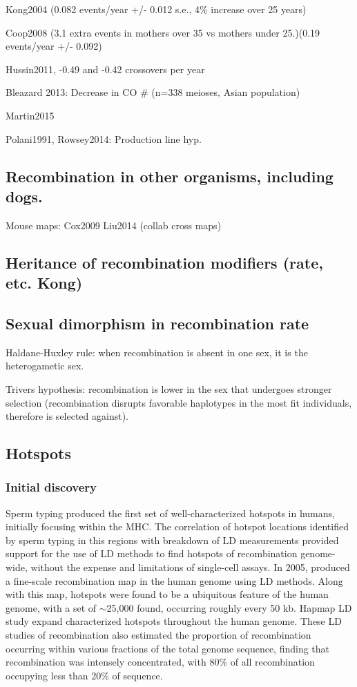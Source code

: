 Kong2004 (0.082 events/year +/- 0.012 s.e., 4\% increase over 25 years)

Coop2008 (3.1 extra events in mothers over 35 vs mothers under 25.)(0.19 events/year +/- 0.092)

Hussin2011, -0.49 and -0.42 crossovers per year

Bleazard 2013: Decrease in CO \# (n=338 meioses, Asian population)

Martin2015

Polani1991, Rowsey2014: Production line hyp.

\subsection{Recombination in other organisms, including dogs.}

Mouse maps:
Cox2009
Liu2014 (collab cross maps)

\subsection{Heritance of recombination modifiers (rate, etc. Kong)}
\subsection{Sexual dimorphism in recombination rate}

Haldane-Huxley rule: when recombination is absent in one sex, it is the heterogametic sex.

Trivers hypothesis: recombination is lower in the sex that undergoes stronger selection (recombination disrupts favorable haplotypes in the most fit individuals, therefore is selected against).

\subsection{Hotspots}

\subsubsection{Initial discovery}

Sperm typing produced the first set of well-characterized hotspots in humans, initially focusing within the MHC\cite{Jeffreys2000,Jeffreys2001}.
The correlation of hotspot locations identified by sperm typing in this regions with breakdown of LD measurements provided support for the use of LD methods to find hotspots of recombination genome-wide, without the expense and limitations of single-cell assays\cite{Jeffreys2001}.
In 2005, \citet{Myers2005} produced a fine-scale recombination map in the human genome using LD methods.
Along with this map, hotspots were found to be a ubiquitous feature of the human genome, with a set of $\sim$25,000 found, occurring roughly every 50 kb.
Hapmap LD study expand characterized hotspots throughout the human genome.
These LD studies of recombination also estimated the proportion of recombination occurring within various fractions of the total genome sequence, finding that recombination was intensely concentrated, with 80\% of all recombination occupying less than 20\% of sequence.

